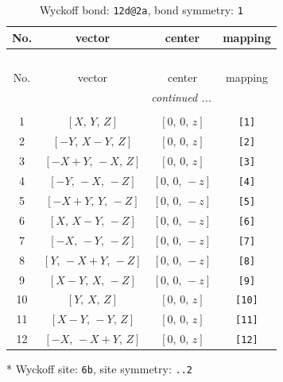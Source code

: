 \documentclass[fleqn,8pt]{jsarticle}
\begin{document}
\begin{longtable}{cccc}
\caption{Wyckoff bond: {\tt 12d@2a}, bond symmetry: {\tt 1}}
 \\
 \hline \hline
No. & vector & center & mapping \\ \hline \endfirsthead

\multicolumn{3}{l}{\tablename\ \thetable{}} \\
 \hline \hline
No. & vector & center & mapping \\ \hline \endhead

 \hline \hline
\multicolumn{3}{r}{\footnotesize\it continued ...} \\ \endfoot

 \hline \hline
\multicolumn{3}{r}{} \\ \endlastfoot

1 & $\left[ X,\, Y,\, Z \right]$ & $\left[ 0,\, 0,\, z \right]$ & {\tt [1]} \\ \hline
2 & $\left[ - Y,\, X - Y,\, Z \right]$ & $\left[ 0,\, 0,\, z \right]$ & {\tt [2]} \\ \hline
3 & $\left[ - X + Y,\, - X,\, Z \right]$ & $\left[ 0,\, 0,\, z \right]$ & {\tt [3]} \\ \hline
4 & $\left[ - Y,\, - X,\, - Z \right]$ & $\left[ 0,\, 0,\, - z \right]$ & {\tt [4]} \\ \hline
5 & $\left[ - X + Y,\, Y,\, - Z \right]$ & $\left[ 0,\, 0,\, - z \right]$ & {\tt [5]} \\ \hline
6 & $\left[ X,\, X - Y,\, - Z \right]$ & $\left[ 0,\, 0,\, - z \right]$ & {\tt [6]} \\ \hline
7 & $\left[ - X,\, - Y,\, - Z \right]$ & $\left[ 0,\, 0,\, - z \right]$ & {\tt [7]} \\ \hline
8 & $\left[ Y,\, - X + Y,\, - Z \right]$ & $\left[ 0,\, 0,\, - z \right]$ & {\tt [8]} \\ \hline
9 & $\left[ X - Y,\, X,\, - Z \right]$ & $\left[ 0,\, 0,\, - z \right]$ & {\tt [9]} \\ \hline
10 & $\left[ Y,\, X,\, Z \right]$ & $\left[ 0,\, 0,\, z \right]$ & {\tt [10]} \\ \hline
11 & $\left[ X - Y,\, - Y,\, Z \right]$ & $\left[ 0,\, 0,\, z \right]$ & {\tt [11]} \\ \hline
12 & $\left[ - X,\, - X + Y,\, Z \right]$ & $\left[ 0,\, 0,\, z \right]$ & {\tt [12]} \\
\end{longtable}
* Wyckoff site: {\tt 6b}, site symmetry: {\tt ..2}
\renewcommand{\arraystretch}{1.2}
\end{document}
